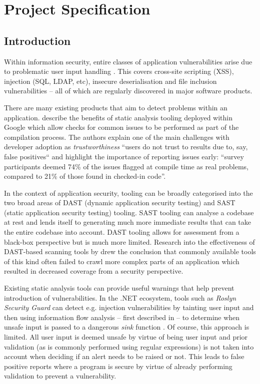 \documentclass[a4paper,openany,12pt]{book}
\begin{document}
\appendix

\chapter{Project Specification}
\label{project:spec}
\section*{Introduction}

Within information security, entire classes of application vulnerabilities arise due to problematic user input handling \citep{christey2007vulnerability}.
This covers cross-site scripting (XSS), injection (SQL, LDAP, etc), insecure
deserialisation and file inclusion vulnerabilities -- all of which are regularly discovered in major software products.

There are many existing products that aim to detect problems within an application. \citet{sadowski2018lessons} describe the benefits of static analysis tooling deployed within Google which allow checks for common issues to be performed as part of the compilation process. The authors explain one of the main challenges with developer adoption as \emph{trustworthiness} ``users do not trust to results due to, say, false positives`` and highlight the importance of reporting issues early: ``survey participants deemed 74\% of the issues flagged at compile time as real problems, compared to 21\% of those found in checked-in code''.

In the context of application security, tooling can be broadly categorised into the two broad areas of DAST (dynamic application security testing) and SAST (static application security testing) tooling. SAST tooling can analyse a codebase at rest and lends itself to generating much more immediate results that can take the entire codebase into account. DAST tooling allows for assessment from a black-box perspective but is much more limited. Research into the effectiveness of DAST-based scanning tools by \citet{doupe2010johnny} drew the conclusion that commonly available tools of this kind often failed to crawl more complex parts of an application which resulted in decreased coverage from a security perspective.

Existing static analysis tools can provide useful warnings that help prevent introduction of vulnerabilities.
In the .NET ecosystem, tools such as \emph{Roslyn Security Guard} can detect e.g. injection vulnerabilities by tainting
user input and then using information flow analysis -- first described in \cite{denning1977certification} -- to
determine when unsafe input is passed to a dangerous \emph{sink} function \citep{rosylynsecguard}.
Of course, this approach is limited.
All user input is deemed unsafe by virtue of being user input and prior validation (as is commonly performed using
regular expressions) is not taken into account when deciding if an alert needs to be raised or not.
This leads to false positive reports where a program is secure by virtue of already performing validation to prevent a
vulnerability.
\end{document}
